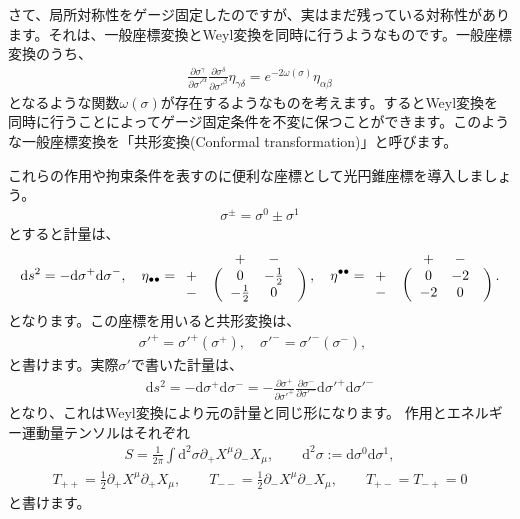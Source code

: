 \documentclass[report,paper=a4, fontsize=12pt, line_length=16cm, number_of_lines=34,dvipdfmx]{jlreq}
\numberwithin{equation}{chapter}
\numberwithin{equation}{section}
\newcommand{\del}{\partial}
\newcommand{\di}{\mathrm{d}}
\begin{document}
さて、局所対称性をゲージ固定したのですが、実はまだ残っている対称性があります。それは、一般座標変換とWeyl変換を同時に行うようなものです。一般座標変換のうち、
\begin{align}
\frac{\del \sigma^{\gamma}}{\del \sigma'^{\alpha}}
\frac{\del \sigma^{\delta}}{\del \sigma'^{\beta}}
\eta_{\gamma\delta}
=e^{-2\omega(\sigma)}\eta_{\alpha\beta}
\end{align}
となるような関数$\omega(\sigma)$が存在するようなものを考えます。するとWeyl変換を同時に行うことによってゲージ固定条件を不変に保つことができます。このような一般座標変換を「共形変換(Conformal transformation)」と呼びます。

これらの作用や拘束条件を表すのに便利な座標として光円錐座標を導入しましょう。
\begin{align}
\sigma^{\pm}=\sigma^{0}\pm\sigma^{1}
\end{align}
とすると計量は、
\begin{align}
\di s^2=-\di \sigma^{+}\di \sigma^{-},\quad
\eta_{\bullet\bullet}=
\begin{array}{crccl}
      && + & - & \\
 + &\ldelim({2}{4pt}[] &0     & -\frac12 &\rdelim){2}{4pt}[]          \\
 - &  &-\frac12      & 0  &
\end{array}
,\quad
\eta^{\bullet\bullet}=
\begin{array}{crccl}
      && + & - & \\
 + &\ldelim({2}{4pt}[] &0     & -2 &\rdelim){2}{4pt}[]          \\
 - &  &-2      & 0  &
\end{array}.
\end{align}
となります。この座標を用いると共形変換は、
\begin{align}
\sigma'^{+}=\sigma'^{+}(\sigma^{+}),\quad
\sigma'^{-}=\sigma'^{-}(\sigma^{-}),\quad
\end{align}
と書けます。実際$\sigma'$で書いた計量は、
\begin{align}
\di s^2=-\di \sigma^{+}\di \sigma^{-}
=-
\frac{\del \sigma^{+}}{\del \sigma'^{+}}
\frac{\del \sigma^{-}}{\del \sigma'^{-}}
\di \sigma'^{+}\di \sigma'^{-}
\end{align}
となり、これはWeyl変換により元の計量と同じ形になります。
作用とエネルギー運動量テンソルはそれぞれ
\begin{align}
S=\frac{1}{2\pi}\int \di^2\sigma \del_{+}X^{\mu}\del_{-}X_{\mu},\qquad \di^2\sigma:=\di\sigma^0 \di\sigma^1,
\label{fixed-action}
\end{align}
\begin{align}
T_{++}=\frac12 \del_{+}X^{\mu}\del_{+}X_{\mu},\qquad
T_{--}=\frac12 \del_{-}X^{\mu}\del_{-}X_{\mu},\qquad
T_{+-}=T_{-+}=0
\label{fixed-em}
\end{align}
と書けます。
\end{document}
